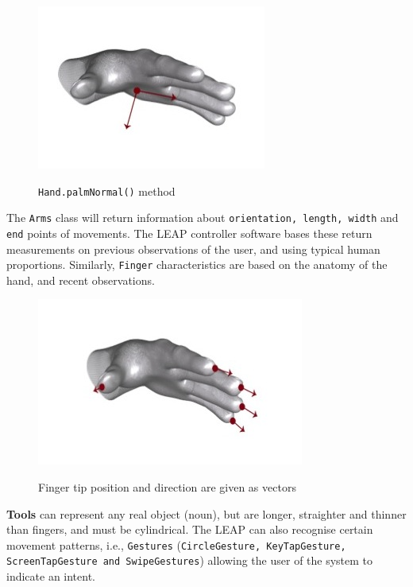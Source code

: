 \documentclass[a4paper, 11pt]{article}
\begin{document}
\begin{justify}
\begin{figure}[H]
\begin{center}
\includegraphics[scale=0.4]{palm}\\
\caption{\texttt{Hand.palmNormal()} method \cite{leap}}
\end{center}
\end{figure}

The \texttt{Arms} class will return information about \texttt{orientation, length, width} and \texttt{end} points of movements. The LEAP controller software bases these return measurements on previous observations of the user, and using typical human proportions. Similarly, \texttt{Finger} characteristics are based on the anatomy of the hand, and recent observations. 

\begin{figure}[H]
\begin{center}
\includegraphics[scale=0.4]{fingers}\\
\caption{Finger tip position and direction are given as vectors \cite{leap}}
\end{center}
\end{figure}

\textbf{Tools} can represent any real object (noun), but are longer, straighter and thinner than fingers, and must be cylindrical. The LEAP can also recognise certain movement patterns, i.e., \texttt{Gestures} (\texttt{CircleGesture, KeyTapGesture, ScreenTapGesture and SwipeGestures}) allowing the user of the system to indicate an intent.


\end{justify}
\end{document}
